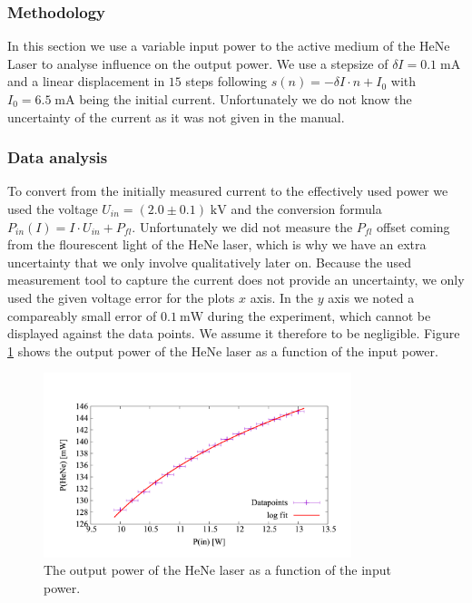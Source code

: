 \documentclass[../main.tex]{subfiles}
\begin{document}
\subsubsection*{Methodology}
    In this section we use a variable input power to the active medium of the HeNe Laser to analyse influence on the output power. We use a stepsize of $\delta I = 0.1\;\si{\mA}$ and a linear displacement in $15$ steps following $s(n) = -\delta I\cdot n + I_0$ with $I_0 = 6.5\;\si{\mA}$ being the initial current. Unfortunately we do not know the uncertainty of the current as it was not given in the manual. 
\subsubsection*{Data analysis}

    To convert from the initially measured current to the effectively used power we used the voltage $U_{\textit{in}} = (2.0\pm 0.1)\;\si{\kV}$ and the conversion formula $P_{\textit{in}}(I) = I \cdot U_{\textit{in}} + P_{fl}$. Unfortunately we did not measure the $P_{fl}$ offset coming from the flourescent light of the HeNe laser, which is why we have an extra uncertainty that we only involve qualitatively later on. 
    Because the used measurement tool to capture the current does not provide an uncertainty, we only used the given voltage error for the plots $x$ axis. In the $y$ axis we noted a compareably small error of $\SI{0.1}{\mW}$ during the experiment, which cannot be displayed against the data points. We assume it therefore to be negligible. Figure \ref{fig:output_power_over_input_power} shows the output power of the HeNe laser as a function of the input power.
    \begin{figure}[H]
        \centering
        \includegraphics[width=0.8\textwidth]{Bilddateien/2/P(HeNe)overP(in)-log.png}
        \caption{The output power of the HeNe laser as a function of the input power.}
        \label{fig:output_power_over_input_power}
    \end{figure}
\end{document}

